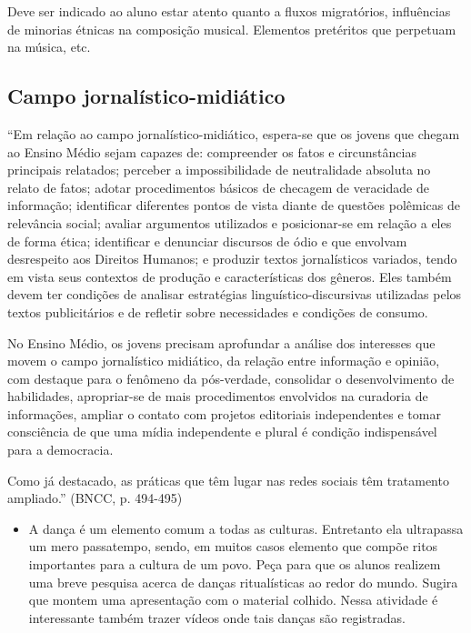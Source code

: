 \documentclass[12pt]{extarticle}
\begin{document}
{Deve ser indicado ao aluno estar atento quanto a fluxos
migratórios, influências de minorias étnicas na composição musical.
Elementos pretéritos que perpetuam na música, etc. }

\subsection{Campo jornalístico-midiático}

``Em relação ao campo jornalístico-midiático, espera-se que os jovens
que chegam ao Ensino Médio sejam capazes de: compreender os fatos e
circunstâncias principais relatados; perceber a impossibilidade de
neutralidade absoluta no relato de fatos; adotar procedimentos básicos
de checagem de veracidade de informação; identificar diferentes pontos
de vista diante de questões polêmicas de relevância social; avaliar
argumentos utilizados e posicionar-se em relação a eles de forma ética;
identificar e denunciar discursos de ódio e que envolvam desrespeito aos
Direitos Humanos; e produzir textos jornalísticos variados, tendo em
vista seus contextos de produção e características dos gêneros. Eles
também devem ter condições de analisar estratégias
linguístico-discursivas utilizadas pelos textos publicitários e de
refletir sobre necessidades e condições de consumo.

No Ensino Médio, os jovens precisam aprofundar a análise dos interesses
que movem o campo jornalístico midiático, da relação entre informação e
opinião, com destaque para o fenômeno da pós-verdade, consolidar o
desenvolvimento de habilidades, apropriar-se de mais procedimentos
envolvidos na curadoria de informações, ampliar o contato com projetos
editoriais independentes e tomar consciência de que uma mídia
independente e plural é condição indispensável para a democracia.

Como já destacado, as práticas que têm lugar nas redes sociais têm
tratamento ampliado.'' (BNCC, p. 494-495)

\begin{itemize}
\item
  A dança é um elemento comum a todas as culturas. Entretanto ela
  ultrapassa um mero passatempo, sendo, em muitos casos elemento que
  compõe ritos importantes para a cultura de um povo. Peça para que os
  alunos realizem uma breve pesquisa acerca de danças ritualísticas ao
  redor do mundo. Sugira que montem uma apresentação com o material
  colhido. Nessa atividade é interessante também trazer vídeos onde tais
  danças são registradas.
\end{itemize}
\end{document}
